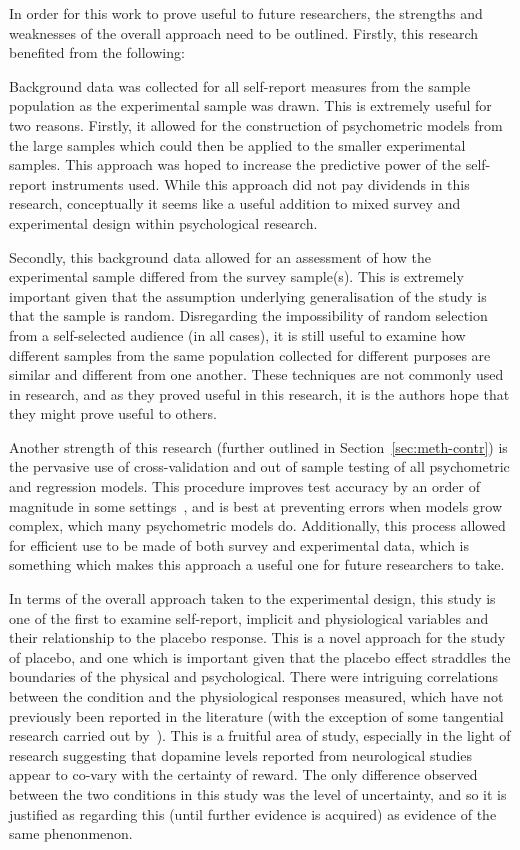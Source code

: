 In order for this work to prove useful to future researchers, the strengths and weaknesses of the overall approach need to be outlined. Firstly, this research benefited from the following:


Background data was collected for all self-report measures from the sample population as the experimental sample was drawn. This is extremely useful for two reasons. Firstly, it allowed for the construction of psychometric models from the large samples which could then be applied to the smaller experimental samples. This approach was hoped to increase the predictive power of the self-report instruments used. While this approach did not pay dividends in this research, conceptually it seems like a useful addition to mixed survey and experimental design within psychological research. 

Secondly, this background data allowed for an assessment of how the experimental sample differed from the survey sample(s). This is extremely important given that the assumption underlying generalisation of the study is that the sample is random. Disregarding the impossibility of random selection from a self-selected audience (in all cases), it is still useful to examine how different samples from the same population collected for different purposes are similar and different from one another. These techniques are not commonly used in research, and as they proved useful in this research, it is the authors hope that they might prove useful to others. 

Another strength of this research (further outlined in Section~\ref{sec:meth-contr}) is the pervasive use of cross-validation and out of sample testing of all psychometric and regression models. This procedure improves test accuracy by an order of magnitude in some settings~\cite{friedman2009elements}, and is best at preventing errors when models grow complex, which many psychometric models do. Additionally, this process allowed for efficient use to be made of both survey and experimental data, which is something which makes this approach a useful one for future researchers to take. 

In terms of the overall approach taken to the experimental design, this study is one of the first to examine self-report, implicit and physiological variables and their relationship to the placebo response. This is a novel approach for the study of placebo, and one which is important given that the placebo effect straddles the boundaries of the physical and psychological. There were intriguing correlations between the condition and the physiological responses measured, which have not previously been reported in the literature (with the exception of some tangential research carried out by~\cite{Fujita2000}). This is a fruitful area of study, especially in the light of research suggesting that dopamine levels reported from neurological studies appear to co-vary with the certainty of reward. The only difference observed between the two conditions in this study was the level of uncertainty, and so it is justified as regarding this (until further evidence is acquired) as evidence of the same phenonmenon. 

